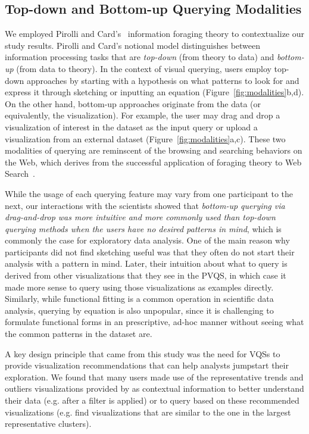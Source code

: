 \subsection{Top-down and Bottom-up Querying Modalities}
\par We employed Pirolli and Card's~\cite{Pirolli} information foraging theory to contextualize our study results. Pirolli and Card's notional model distinguishes between information processing tasks that are \textit{top-down} (from theory to data) and \textit{bottom-up} (from data to theory). In the context of visual querying, users employ top-down approaches by starting with a hypothesis on what patterns to look for and express it through sketching or inputting an equation (Figure~\ref{fig:modalities}b,d). On the other hand, bottom-up approaches originate from the data (or equivalently, the visualization). For example, the user may drag and drop a visualization of interest in the dataset as the input query or upload a visualization from an external dataset (Figure~\ref{fig:modalities}a,c). These two modalities of querying are reminscent of the browsing and searching behaviors on the Web, which derives from the successful application of foraging theory to Web Search~\cite{Olston2003}.
\par While the usage of each querying feature may vary from one participant to the next, our interactions with the scientists showed that \emph{bottom-up querying via drag-and-drop was more intuitive and more commonly used than top-down querying methods when the users have no desired patterns in mind}, which is commonly the case for exploratory data analysis. One of the main reason why participants did not find sketching useful was that they often do not start their analysis with a pattern in mind. Later, their intuition about what to query is derived from other visualizations that they see in the PVQS, in which case it made more sense to query using those visualizations as examples directly. Similarly, while functional fitting is a common operation in scientific data analysis, querying by equation is also unpopular, since it is challenging to formulate functional forms in an prescriptive, ad-hoc manner without seeing what the common patterns in the dataset are. 
\par A key design principle that came from this study was the need for VQSs to provide visualization recommendations that can help analysts jumpstart their exploration. We found that many users made use of the representative trends and outliers visualizations provided by \zv as contextual information to better understand their data (e.g. after a filter is applied) or to query based on these recommended visualizations (e.g. find visualizations that are similar to the one in the largest representative clusters). 
